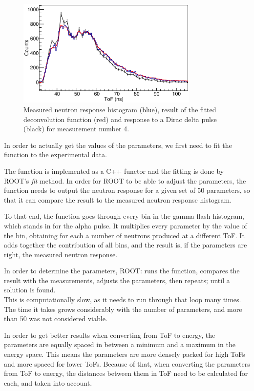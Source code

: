 \documentclass[a4paper,12pt]{report}
\begin{document}
\begin{figure}[H]
	\centering
	\includegraphics[width=0.80\textwidth]{pulsed_deconvolution_delta.eps}
	\caption{Measured neutron response histogram (blue), result of the fitted deconvolution function (red) and response to a Dirac delta pulse (black) for measurement number 4.}
	\label{pulsed_deconvolution_delta}
\end{figure}

In order to actually get the values of the parameters, we first need to fit the function to the experimental data.

The function is implemented as a C++ functor and the fitting is done by ROOT's \textit{fit} method.
In order for ROOT to be able to adjust the parameters, the function needs to output the neutron response for a given set of 50 parameters, so that it can compare the result to the measured neutron response histogram.

To that end, the function goes through every bin in the gamma flash histogram, which stands in for the alpha pulse.
It multiplies every parameter by the value of the bin, obtaining for each a number of neutrons produced at a different ToF.
It adds together the contribution of all bins, and the result is, if the parameters are right, the measured neutron response.

In order to determine the parameters, ROOT: runs the function, compares the result with the measurements, adjusts the parameters, then repeats; until a solution is found.
\\

This is computationally slow, as it needs to run through that loop many times.
The time it takes grows considerably with the number of parameters, and more than 50 was not considered viable.

In order to get better results when converting from ToF to energy, the parameters are equally spaced in between a minimum and a maximum in the energy space.
This means the parameters are more densely packed for high ToFs and more spaced for lower ToFs.
Because of that, when converting the parameters from ToF to energy, the distances between them in ToF need to be calculated for each, and taken into account.
\\
\end{document}
